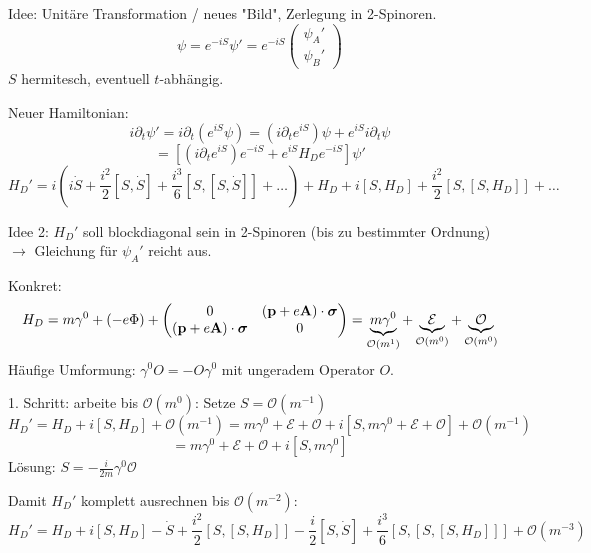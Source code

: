\documentclass[11pt,a4paper]{report}
\renewcommand{\vec}{\boldsymbol}
\begin{document}
Idee: Unitäre Transformation / neues "Bild", Zerlegung in 2-Spinoren.
$$\psi = e^{-iS}\psi '=e^{-iS}\begin{pmatrix}
\psi_A' \\ \psi_B'
\end{pmatrix}$$
$S$ hermitesch, eventuell $t$-abhängig.\par 

Neuer Hamiltonian:
$$i\partial_t\psi' = i\partial_t (e^{iS}\psi ) = (i\partial_t e^{iS})\psi + e^{iS}i\partial_t\psi$$
$$=\left[ (i\partial_te^{iS})e^{-iS}+e^{iS}H_De^{-iS}\right]\psi '$$
$$H_D'=i(i\dot{S}+\frac{i^2}{2}[S,\dot{S}]+\frac{i^3}{6}[S,[S,\dot{S}]]+\ldots )+ H_D + i[S,H_D]+\frac{i^2}{2}[S,[S,H_D]]+\ldots$$

Idee 2: $H_D'$ soll blockdiagonal sein in 2-Spinoren (bis zu bestimmter Ordnung) $\rightarrow$ Gleichung für $\psi_A '$ reicht aus.\par 

Konkret: 
$$H_D=m\gamma^0 + (-e\Phi ) + \begin{pmatrix}
0 & (\vf{p}+e\vf{A})\cdot\vec{\sigma} \\
(\vf{p}+e\vf{A})\cdot\vec{\sigma} & 0
\end{pmatrix}= \underbrace{m\gamma^0}_{\mathcal{O}(m^1)} + \underbrace{\mathcal{E}}_{{\mathcal{O}(m^0)}} + \underbrace{\mathcal{O}}_{{\mathcal{O}(m^0)}}$$
Häufige Umformung: $\gamma^0 O =-O\gamma^0$ mit ungeradem Operator $O$.\par 

1. Schritt: arbeite bis $\mathcal{O}(m^0)$: Setze $S=\mathcal{O}(m^{-1})$
$$H_D'=H_D + i[S,H_D] + \mathcal{O}(m^{-1}) = m\gamma^0+\mathcal{E}+\mathcal{O}+i[S,m\gamma^0+\mathcal{E}+\mathcal{O}] + \mathcal{O}(m^{-1})$$
$$=m\gamma^0 +\mathcal{E}+\mathcal{O} + i[S,m\gamma^0]$$
Lösung: $S=-\frac{i}{2m}\gamma^0\mathcal{O}$\par 
Damit $H_D'$ komplett ausrechnen bis $\mathcal{O}(m^{-2})$:
$$H_D'=H_D+i[S,H_D]-\dot{S}+\frac{i^2}{2}[S,[S,H_D]]-\frac{i}{2}[S,\dot{S}] + \frac{i^3}{6}[S,[S,[S,H_D]]]+\mathcal{O}(m^{-3})$$
\end{document}
